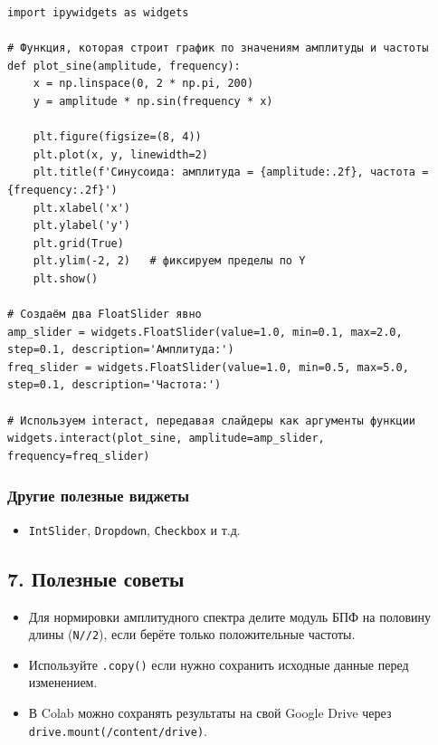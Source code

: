 \documentclass[12pt,a4paper,openany]{book}
\providecommand{\tightlist}{\setlength{\itemsep}{0pt}\setlength{\parskip}{0pt}}
\begin{document}
\begin{Verbatim}[fontsize=\small, breaklines, breakanywhere]
import ipywidgets as widgets

# Функция, которая строит график по значениям амплитуды и частоты
def plot_sine(amplitude, frequency):
    x = np.linspace(0, 2 * np.pi, 200)
    y = amplitude * np.sin(frequency * x)
    
    plt.figure(figsize=(8, 4))
    plt.plot(x, y, linewidth=2)
    plt.title(f'Синусоида: амплитуда = {amplitude:.2f}, частота = {frequency:.2f}')
    plt.xlabel('x')
    plt.ylabel('y')
    plt.grid(True)
    plt.ylim(-2, 2)   # фиксируем пределы по Y
    plt.show()

# Создаём два FloatSlider явно
amp_slider = widgets.FloatSlider(value=1.0, min=0.1, max=2.0, step=0.1, description='Амплитуда:')
freq_slider = widgets.FloatSlider(value=1.0, min=0.5, max=5.0, step=0.1, description='Частота:')

# Используем interact, передавая слайдеры как аргументы функции
widgets.interact(plot_sine, amplitude=amp_slider, frequency=freq_slider)
\end{Verbatim}

\subsubsection*{Другие полезные виджеты}

\begin{itemize}
\tightlist
\item
  \texttt{IntSlider}, \texttt{Dropdown}, \texttt{Checkbox} и т.д.
\end{itemize}

\subsection*{7. Полезные советы}

\begin{itemize}
\tightlist
\item
  Для нормировки амплитудного спектра делите модуль БПФ на половину длины (\texttt{N/\allowbreak{}/\allowbreak{}2}), если берёте только положительные частоты.
\item
  Используйте \texttt{.\allowbreak{}copy(\allowbreak{})} если нужно сохранить исходные данные перед изменением.
\item
  В Colab можно сохранять результаты на свой Google Drive через \texttt{drive.\allowbreak{}mount(\allowbreak{}\textquotesingle{}\allowbreak{}/\allowbreak{}content/\allowbreak{}drive\textquotesingle{}\allowbreak{})}.
\end{itemize}
\end{document}
